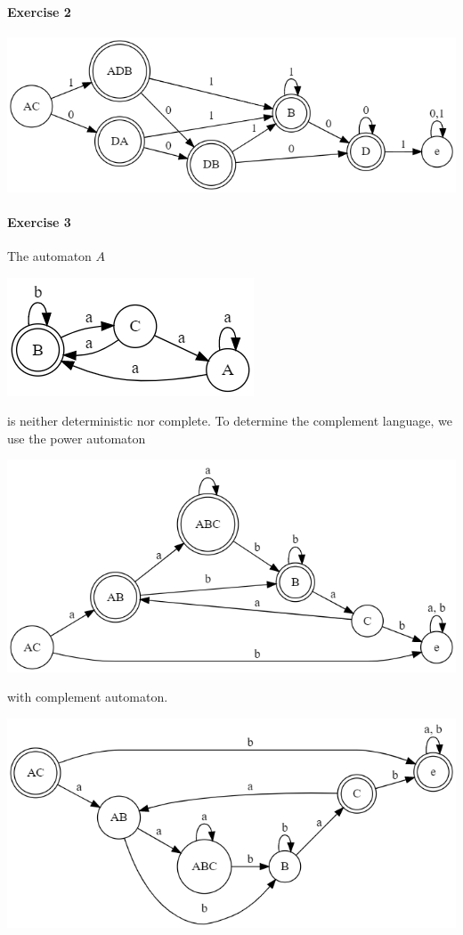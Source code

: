 \documentclass{article}
\begin{document}
\paragraph{Exercise 2}

\begin{center}
    \includegraphics[width=.8\textwidth]{2_power.png}
\end{center}

\paragraph{Exercise 3}

The automaton $A$

\begin{center}
    \includegraphics[width=.35\textwidth]{3_initial.png}
\end{center}

is neither deterministic nor complete. To determine the complement language, we use the power automaton

\begin{center}
    \includegraphics[width=.75\textwidth]{3_power.png}
\end{center}

with complement automaton.

\begin{center}
    \includegraphics[width=.75\textwidth]{3_complement.png}
\end{center}
\end{document}

